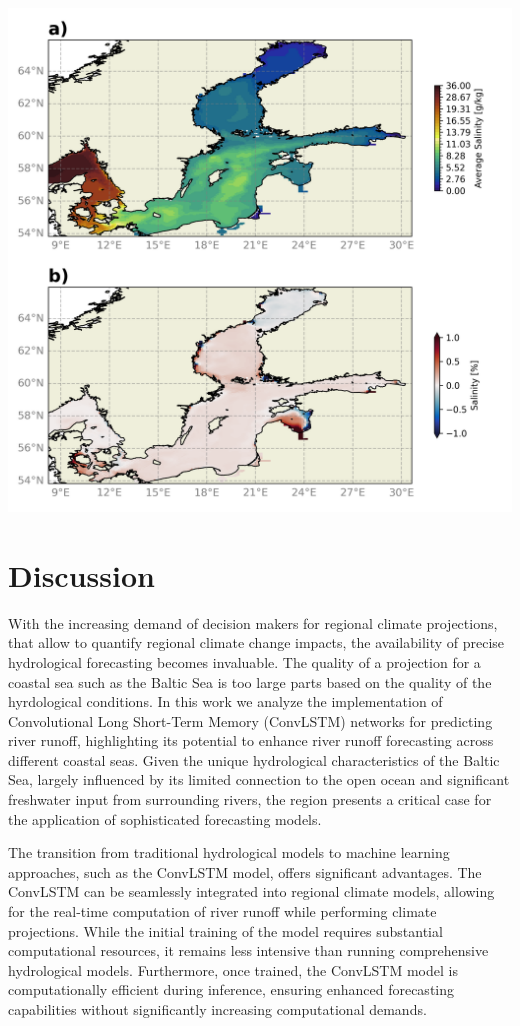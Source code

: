 \documentclass[
]{agujournal2019}
\begin{document}
\includegraphics{../src/figures/evaluation_MOM.png}

\section{Discussion}\label{discussion}

With the increasing demand of decision makers for regional climate
projections, that allow to quantify regional climate change impacts, the
availability of precise hydrological forecasting becomes invaluable. The
quality of a projection for a coastal sea such as the Baltic Sea is too
large parts based on the quality of the hyrdological conditions. In this
work we analyze the implementation of Convolutional Long Short-Term
Memory (ConvLSTM) networks for predicting river runoff, highlighting its
potential to enhance river runoff forecasting across different coastal
seas. Given the unique hydrological characteristics of the Baltic Sea,
largely influenced by its limited connection to the open ocean and
significant freshwater input from surrounding rivers, the region
presents a critical case for the application of sophisticated
forecasting models.

The transition from traditional hydrological models to machine learning
approaches, such as the ConvLSTM model, offers significant advantages.
The ConvLSTM can be seamlessly integrated into regional climate models,
allowing for the real-time computation of river runoff while performing
climate projections. While the initial training of the model requires
substantial computational resources, it remains less intensive than
running comprehensive hydrological models. Furthermore, once trained,
the ConvLSTM model is computationally efficient during inference,
ensuring enhanced forecasting capabilities without significantly
increasing computational demands.
\end{document}
